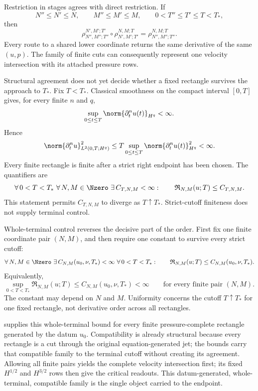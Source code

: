 Restriction in stages agrees with direct restriction.
If
\[
  N''\le N'\le N,
  \qquad
  M''\le M'\le M,
  \qquad
  0<T''\le T'\le T<T_*,
\]
then
\[
  \rho_{N'',M'';T''}^{N',M';T'}
  \circ
  \rho_{N',M';T'}^{N,M;T}
  =
  \rho_{N'',M'';T''}^{N,M;T}.
\]
Every route to a shared lower coordinate returns the same derivative of the same \((u,p)\).
The family of finite cuts can consequently represent one velocity intersection with its attached pressure rows.

Structural agreement does not yet decide whether a fixed rectangle survives the approach to \(T_*\).
Fix \(T<T_*\).
Classical smoothness on the compact interval \([0,T]\) gives, for every finite \(n\) and \(q\),
\[
  \sup_{0\le t\le T}
  \norm{\partial_t^nu(t)}_{H^q}
  <
  \infty.
\]
Hence
\[
  \norm{\partial_t^nu}_{L^2(0,T;H^q)}^2
  \le
  T
  \sup_{0\le t\le T}
  \norm{\partial_t^nu(t)}_{H^q}^2
  <
  \infty.
\]
Every finite rectangle is finite after a strict right endpoint has been chosen.
The quantifiers are
\[
  \forall\,0<T<T_*
  \ \forall\,N,M\in\Nzero
  \ \exists\,C_{T,N,M}<\infty:
  \qquad
  \mathfrak R_{N,M}(u;T)
  \le
  C_{T,N,M}.
\]
This statement permits \(C_{T,N,M}\) to diverge as \(T\uparrow T_*\).
Strict-cutoff finiteness does not supply terminal control.

Whole-terminal control reverses the decisive part of the order.
First fix one finite coordinate pair \((N,M)\), and then require one constant to survive every strict cutoff:
\[
  \forall\,N,M\in\Nzero
  \ \exists\,C_{N,M}(u_0,\nu,T_*)<\infty
  \ \forall\,0<T<T_*:
  \qquad
  \mathfrak R_{N,M}(u;T)
  \le
  C_{N,M}(u_0,\nu,T_*).
\]
Equivalently,
\[
  \sup_{0<T<T_*}
  \mathfrak R_{N,M}(u;T)
  \le
  C_{N,M}(u_0,\nu,T_*)
  <
  \infty
  \qquad
  \text{for every finite pair }(N,M).
\]
The constant may depend on \(N\) and \(M\).
Uniformity concerns the cutoff \(T\uparrow T_*\) for one fixed rectangle, not derivative order across all rectangles.

 supplies this whole-terminal bound for every finite pressure-complete rectangle generated by the datum \(u_0\).
Compatibility is already structural because every rectangle is a cut through the original equation-generated jet; the bounds carry that compatible family to the terminal cutoff without creating its agreement.
Allowing all finite pairs yields the complete velocity intersection first; its fixed \(H^{1/2}\) and \(H^{3/2}\) rows then give the critical readouts.
This datum-generated, whole-terminal, compatible family is the single object carried to the endpoint.
